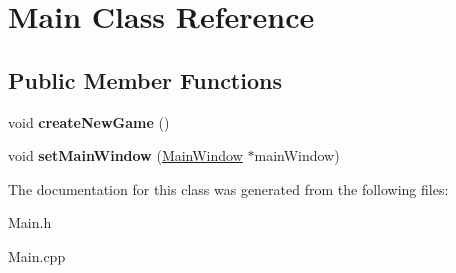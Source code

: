\hypertarget{classMain}{}\section{Main Class Reference}
\label{classMain}
\subsection*{Public Member Functions}
\begin{DoxyCompactItemize}
\item 
\mbox{\label{classMain_ac571e6baf12f5a18795042ce47598f2f}} 
void {\bfseries create\+New\+Game} ()
\item 
\mbox{\label{classMain_aa058b586d5d94b090932e206e5dc76d7}} 
void {\bfseries set\+Main\+Window} (\hyperlink{classMainWindow}{Main\+Window} $\ast$main\+Window)
\end{DoxyCompactItemize}


The documentation for this class was generated from the following files\+:\begin{DoxyCompactItemize}
\item 
Main.\+h\item 
Main.\+cpp\end{DoxyCompactItemize}
